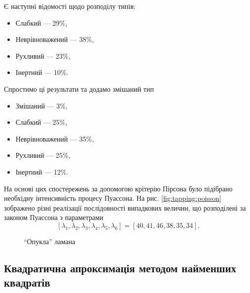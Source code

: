 Є наступні відомості щодо розподілу типів:
\begin{itemize}
  \item
    Слабкий --- 29\%,
  \item
    Неврівноважений --- 38\%,
  \item
    Рухливий --- 23\%,
  \item
    Інертний --- 10\%.
\end{itemize}
Спростимо ці результати та додамо змішаний тип
\begin{itemize}
  \item
    Змішаний --- 3\%,
  \item
    Слабкий --- 25\%,
  \item
    Неврівноважений --- 35\%,
  \item
    Рухливий --- 25\%,
  \item
    Інертний --- 12\%.
\end{itemize}
На основі цих спостережень за допомогою крітерію Пірсона
було підібрано необхідну інтенсивність процесу Пуассона.
На рис. \ref{fig:tapping:poisson} зображено різні реалізації послідовності
випадкових величин, що розподілені за законом Пуассона з параметрами
\begin{equation}\label{eq:tapping:poisson}
  \left[ \lambda_{1}, \lambda_{2}, \lambda_{3}, \lambda_{4}, \lambda_{5},
         \lambda_{6} \right]
  = \left[ 40, 41, 46, 38, 35, 34 \right].
\end{equation}

\begin{figure}[h]
  \centering
  \caption{``Опукла'' ламана}
  \label{fig:tapping:Ilin01}
\end{figure}


\subsection{Квадратична апроксимація методом найменших квадратів}

